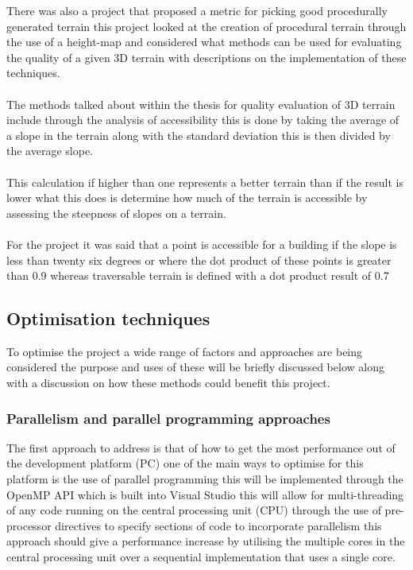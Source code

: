 There was also a project that proposed a metric for picking good procedurally generated terrain this project looked at the creation of procedural terrain through the use of a height-map and considered what methods can be used for evaluating the quality of a given 3D terrain with descriptions on the implementation of these techniques.\\\\The methods talked about within the thesis \cite{honours2} for quality evaluation of 3D terrain include through the analysis of accessibility this is done by taking the average of a slope in the terrain along with the standard deviation this is then divided by the average slope.\\\\This calculation if higher than one represents a better terrain than if the result is lower what this does is determine how much of the terrain is accessible by assessing the steepness of slopes on a terrain.\\\\For the project \cite{honours2} it was said that a point is accessible for a building if the slope is less than twenty six degrees or where the dot product of these points is greater than 0.9 whereas traversable terrain is defined with a dot product result of 0.7  

\subsection{Optimisation techniques}
To optimise the project a wide range of factors and approaches are being considered the purpose and uses of these will be briefly discussed below along with a discussion on how these methods could benefit this project.\\

\subsubsection{Parallelism and parallel programming approaches}
The first approach to address is that of how to get the most performance out of the development platform (PC) one of the main ways to optimise for this platform is the use of parallel programming this will be implemented through the OpenMP API \cite{Openmp}which is built into Visual Studio this will allow for multi-threading of any code running on the central processing unit (CPU) through the use of pre-processor directives to specify sections of code to incorporate parallelism this approach should give a performance increase by utilising the multiple cores in the central processing unit over a sequential implementation that uses a single core.

